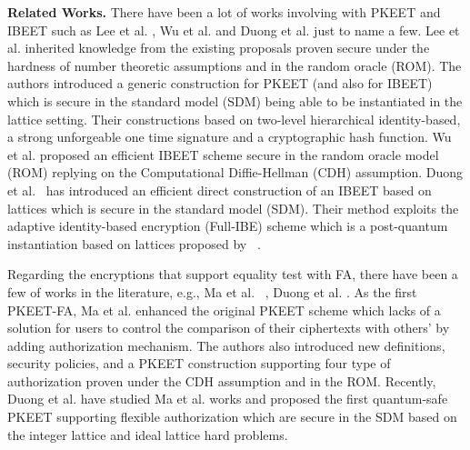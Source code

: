 \documentclass[runningheads,10pt]{llncs}
\begin{document}
\noindent \textbf{Related Works.}	 
There have been a lot of works involving with PKEET and IBEET such as Lee et al. \cite{Lee2016}, Wu et al. \cite{WZCH18} and Duong et al. \cite{IBEET-Duong19} just to name a few. 	Lee et al. \cite{Lee2016} inherited knowledge from the existing proposals proven secure under the hardness of number theoretic assumptions and in the random oracle (ROM). The authors  introduced a generic construction for PKEET (and also for IBEET) which is secure  in the standard model (SDM) being able to be instantiated in the lattice setting. Their constructions based on two-level hierarchical identity-based, a strong unforgeable one time signature and a cryptographic hash function. Wu et al. \cite{WZCH18}  proposed an efficient
IBEET scheme secure in the random oracle model (ROM) replying on the Computational Diffie-Hellman (CDH) assumption. Duong et al.~\cite{IBEET-Duong19} has introduced an efficient direct construction of an IBEET based on lattices which is secure in the standard model (SDM). Their method exploits the adaptive identity-based encryption (Full-IBE) scheme which is a post-quantum instantiation based on lattices proposed by ~\cite{ABB10-EuroCrypt}.

Regarding the encryptions that support equality test with FA, there have been a few of works in the literature, e.g., 	Ma et al.  ~\cite{PKEET-FA-Maetal-16}, Duong et al. \cite{PKEET-FA-Duong20}.  As the first PKEET-FA, Ma et al. \cite{PKEET-FA-Maetal-16} enhanced the original PKEET scheme which lacks of a solution for users to control the comparison of their ciphertexts with others' by adding authorization mechanism. The authors also introduced new definitions, security policies, and a PKEET construction supporting four type of authorization proven under the CDH assumption and in the ROM. Recently, Duong et al. \cite{PKEET-FA-Duong20} have studied Ma et al. works and proposed the first quantum-safe PKEET supporting flexible authorization  which are secure in the SDM based on the integer lattice and ideal lattice hard problems.

\end{document}
